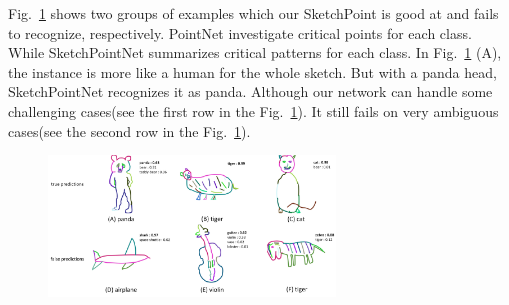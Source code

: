 Fig.~\ref{fig:resshow} shows two groups of examples which our SketchPoint is good at and fails to recognize, respectively. PointNet investigate critical points for each class. While SketchPointNet summarizes critical patterns for each class. In Fig.~\ref{fig:resshow} (A), the instance is more like a human for the whole sketch. But with a panda head, SketchPointNet recognizes it as panda.
Although our network can handle some challenging cases(see the first row in the Fig.~\ref{fig:resshow}). It still fails on very ambiguous cases(see the second row in the Fig.~\ref{fig:resshow}).

\begin{figure}[htbp]
    \center
    \includegraphics[width=3in]{images/res.png}
    \label{fig:resshow}
\end{figure}
